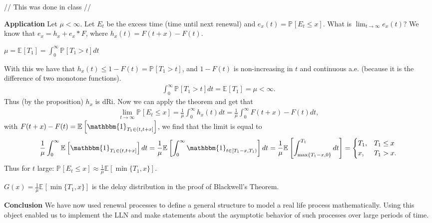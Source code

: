 {\color{blue}
// This was done in class //

\noindent \textbf{Application} Let $\mu < \infty$. Let $E_t$ be the excess time (time until next renewal) and $e_x(t) = \mathbb{P}_{} \left[ E_t \leq x \right] $. What is $\lim_{t \to \infty} e_x(t)$? We know that $e_x = h_x + e_x*F$, where $h_x(t) = F(t+x)-F(t)$.
\begin{rmk}[]
	$\mu = \mathbb{E}_{} \left[ T_1 \right] = \int_{0}^{\infty} \mathbb{P}_{} \left[ T_1 > t \right] dt$
\end{rmk}
\noindent With this we have that $h_x(t) \leq 1 - F(t) = \mathbb{P}_{} \left[ T_1 > t \right] $, and $1-F(t)$ is non-increasing in $t$ and continuous a.e. (because it is the difference of two monotone functions). 
\begin{align}
	\int_{0}^{\infty} \mathbb{P}_{} \left[ T_1 > t \right] dt = \mathbb{E}_{} \left[ T_1 \right] = \mu < \infty .
\end{align}
Thus (by the proposition) $h_x$ is dRi. Now we can apply the theorem and get that 
\begin{align}
	\lim_{t \to \infty} \mathbb{P}_{} \left[ E_t \leq x \right] = \frac{1}{\mu } \int_{0}^{\infty} h_x(t)dt = \frac{1}{\mu } \int_{0}^{\infty} F(t+x) - F(t) dt,
\end{align}
with $F(t+x) - F(t) = \mathbb{E}_{} \left[ \mathbbm{1}_{T_1 \in (t, t+x]} \right] $, we find that the limit is equal to 
\begin{align}
	\frac{1}{\mu } \int_{0}^{\infty} \mathbb{E}_{} \left[ \mathbbm{1}_{T_1 \in (t, t+x]} \right]dt = \frac{1}{\mu} \mathbb{E}_{} \left[ \int_{0}^{ \infty } \mathbbm{1}_{t \in [T_1 -x, T_1)}    \right]dt = \frac{1}{\mu } \mathbb{E}_{} \left[ \int_{\max\{T_1-x, 0\}}^{T_1} dt \right] =  
	\begin{cases}
		T_1, & T_1 \leq x \\
		x, & T_1 > x.
	\end{cases}
\end{align}
Thus for $t$ large:  $\mathbb{P}_{} \left[ E_t \leq x \right] \approx  \frac{1}{\mu} \mathbb{E}_{} \left[ \min\{T_1, x\} \right]  $. 

\begin{rmk}[]
	$G(x) = \frac{1}{\mu } \mathbb{E}_{} \left[ \min\{T_1, x\} \right] $ is the delay distribution in the proof of Blackwell's Theorem.
\end{rmk}
}
\noindent \textbf{Conclusion} We have now used renewal processes to define a general structure to model a real life process mathematically. Using this object enabled us to implement the LLN and make statements about the asymptotic behavior of such processes over large periods of time.



